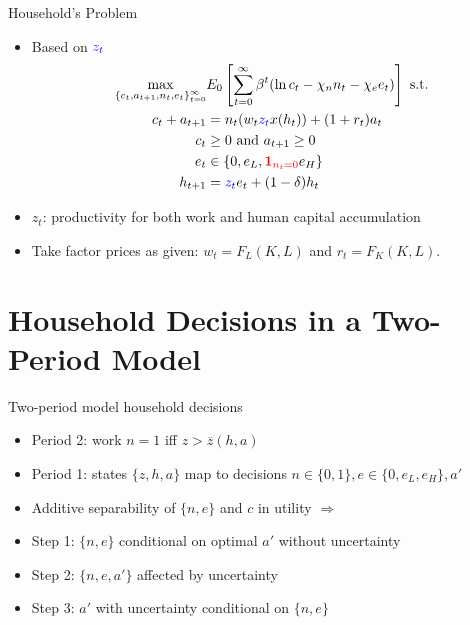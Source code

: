 \documentclass[serif, aspectratio=169]{beamer}
\theoremstyle{remark}
\theoremstyle{plain}
\begin{document}
\begin{frame}{Household's Problem}
\begin{itemize}
\item Based on $\color{blue}z_t\color{black}$
\begin{align}
\max_{\left \{ c_t,a_{t+1},n_t,e_t\right \}_{t=0}^{\infty }}&E_0\left[
\sum\limits_{t=0}^{\infty }\beta^t( \ln c_t-\chi_n n_t-\chi_e e_t ) \right] \text{ s.t.} \\
    c_t+a_{t+1}&=n_t( w_t\color{blue}z_t\color{black}x(h_t))+(1+r_t)a_t \\
    c_t& \geq 0 \text{ and } a_{t+1} \geq 0 \\
    e_t& \in \{0, e_L, \color{red}\mathbf{1}_{n_t=0}\color{black}e_H\} \\
    h_{t+1}&=\color{blue}z_t\color{black}e_t + (1-\delta)h_t
\end{align}    
\item $z_t$: productivity for both work and human capital accumulation
\item Take factor prices as given: $w_t = F_L(K,L)$ and $r_t=F_K(K,L)$.
\end{itemize}
\end{frame}

\section{Household Decisions in a Two-Period Model}
\begin{frame}{Two-period model household decisions}
\begin{itemize}
    \item Period 2: work $n=1$ iff $z>\overline{z}(h,a)$
    \medskip
    \item Period 1: states $\{z,h,a\}$ map to decisions $n\in\{0,1\}, e\in\{0,e_L,e_H\}, a'$
    \smallskip
    \item[] Additive separability of $\{n,e\}$ and $c$ in utility $\Rightarrow$ 
    \item[] Step 1: $\{n,e\}$ conditional on optimal $a'$ without uncertainty
    \item[] Step 2: $\{n,e,a'\}$ affected by uncertainty
    \item[] Step 3: $a'$ with uncertainty conditional on $\{n,e\}$ 
\end{itemize}

\end{frame}
\end{document}
